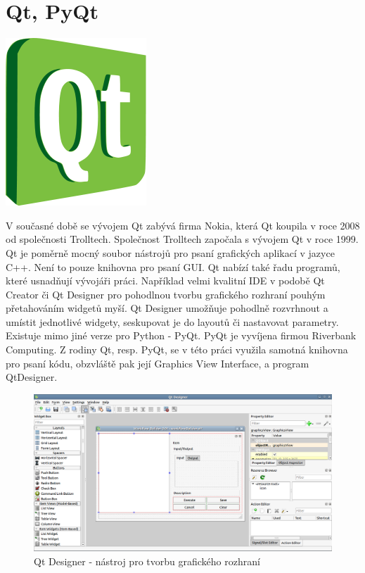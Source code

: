 \newpage
\section{Qt, PyQt}
\nocite{pyqt:www}

\begin{center}
	\includegraphics[scale=0.3]{pictures/qt_logo}
\end{center}

V současné době se vývojem Qt zabývá firma Nokia, která Qt koupila v roce 2008 od společnosti Trolltech. Společnost Trolltech započala s vývojem Qt v roce 1999. Qt je poměrně mocný soubor nástrojů pro psaní grafických aplikací v jazyce C++. Není to pouze knihovna pro psaní GUI. Qt nabízí také řadu programů, které usnadňují vývojáři práci. Například velmi kvalitní IDE v podobě Qt Creator či Qt Designer pro pohodlnou tvorbu grafického rozhraní pouhým přetahováním widgetů myší. Qt Designer umožňuje pohodlně rozvrhnout a umístit jednotlivé widgety, seskupovat je do layoutů či nastavovat parametry. \\
\indent Existuje mimo jiné verze pro Python - PyQt. PyQt je vyvíjena firmou Riverbank Computing. Z rodiny Qt, resp. PyQt, se v této práci využila samotná knihovna pro psaní kódu, obzvláště pak její Graphics View Interface, a program QtDesigner. \\

\begin{figure}[h]
	\centering
	\includegraphics[scale=0.35]{pictures/qt/qt_designer}
	\caption{Qt Designer - nástroj pro tvorbu grafického rozhraní}
  	\label{qtdesigner}
\end{figure}

